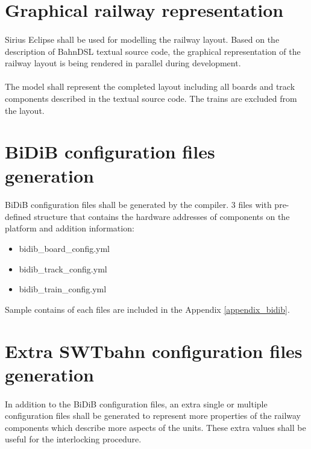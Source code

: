 \documentclass[a4paper,11pt]{scrreprt}
\begin{document}
\section{Graphical railway representation}

\paragraph{}Sirius Eclipse shall be used for modelling the railway layout. Based on the description of BahnDSL textual source code, the graphical representation of the railway layout is being rendered in parallel during development.

\paragraph{}The model shall represent the completed layout including all boards and track components described in the textual source code. The trains are excluded from the layout.

\section{BiDiB configuration files generation}

\paragraph{}BiDiB configuration files shall be generated by the compiler. 3 files with pre-defined structure that contains the hardware addresses of components on the platform and addition information:
\begin{itemize}
    \item bidib_board_config.yml
    \item bidib_track_config.yml
    \item bidib_train_config.yml
\end{itemize}

Sample contains of each files are included in the Appendix \ref{appendix_bidib}.

\section{Extra SWTbahn configuration files generation}

\paragraph{}In addition to the BiDiB configuration files, an extra single or multiple configuration files shall be generated to represent more properties of the railway components which describe more aspects of the units. These extra values shall be useful for the interlocking procedure.
\end{document}
